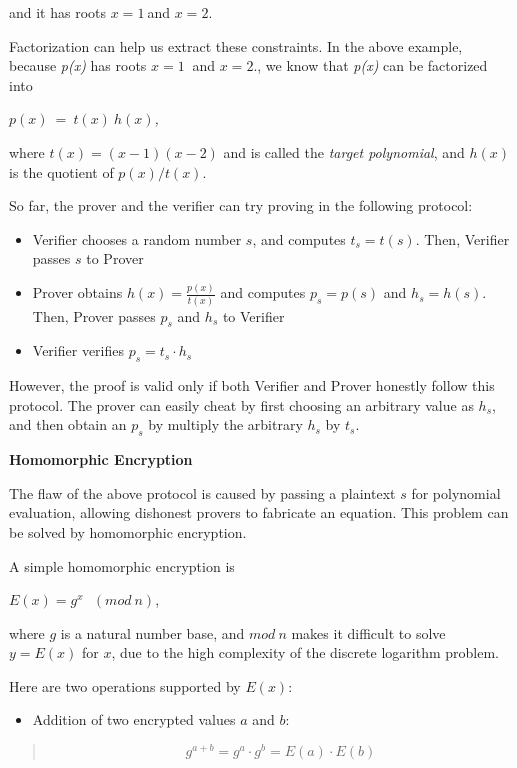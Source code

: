 \documentclass[
]{report}
\providecommand{\tightlist}{%
  \setlength{\itemsep}{0pt}\setlength{\parskip}{0pt}}
\begin{document}
and it has roots \(x = 1\ \)and \(x = 2\).

Factorization can help us extract these constraints. In the above
example, because \emph{p(x)} has roots \(x = 1\ \) and \(x = 2\)., we
know that \emph{p(x)} can be factorized into

\(p(x)\  = \ t(x)\ h(x)\)\emph{,}

where \(t(x) = (x - 1)(x - 2)\) and is called the \emph{target
polynomial}, and \(h(x)\) is the quotient of \(p(x)\text{/}t(x)\).

So far, the prover and the verifier can try proving in the following
protocol:

\begin{itemize}
\item
  Verifier chooses a random number \(s\), and computes \(t_{s} = t(s)\).
  Then, Verifier passes \(s\) to Prover
\item
  Prover obtains \(h(x) = \frac{p(x)}{t(x)}\) and computes
  \(p_{s} = p(s)\) and \(h_{s} = h(s)\). Then, Prover passes \(p_{s}\)
  and \(h_{s}\) to Verifier
\item
  Verifier verifies \(p_{s} = t_{s} \cdot h_{s}\)
\end{itemize}

However, the proof is valid only if both Verifier and Prover honestly
follow this protocol. The prover can easily cheat by first choosing an
arbitrary value as \(h_{s}\), and then obtain an \(p_{s}\) by multiply
the arbitrary \(h_{s}\) by \(t_{s}\).

\textbf{Homomorphic Encryption}

The flaw of the above protocol is caused by passing a plaintext \(s\)
for polynomial evaluation, allowing dishonest provers to fabricate an
equation. This problem can be solved by homomorphic encryption.

A simple homomorphic encryption is

\(E(x) = g^{x}\ \ \ (mod\ n)\),

where \(g\) is a natural number base, and \(mod\ n\) makes it difficult
to solve \(y = E(x)\) for \(x\), due to the high complexity of the
discrete logarithm problem.

Here are two operations supported by \(E(x)\):

\begin{itemize}
\tightlist
\item
  Addition of two encrypted values \(a\) and \(b\):
\end{itemize}

\begin{quote}
\[g^{a + b} = g^{a} \cdot g^{b} = E(a) \cdot E(b)\]
\end{quote}
\end{document}
